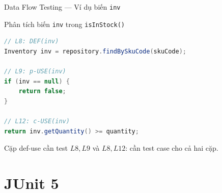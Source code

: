 \documentclass[aspectratio=169,12pt]{beamer}
\begin{document}
\begin{frame}[fragile]{Data Flow Testing --- Ví dụ biến \texttt{inv}}
  \begin{exampleblock}{Phân tích biến \texttt{inv} trong \texttt{isInStock()}}
\begin{lstlisting}[language=java,style=nonumber,basicstyle=\ttfamily\footnotesize]
// L8: DEF(inv)
Inventory inv = repository.findBySkuCode(skuCode);

// L9: p-USE(inv)
if (inv == null) {
    return false;
}

// L12: c-USE(inv)
return inv.getQuantity() >= quantity;
\end{lstlisting}
  \end{exampleblock}

  \vspace{0.3em}
  \Large
  \begin{block}{Cặp def-use cần test}
    \(L8, L9\) và \(L8, L12\): cần test case cho cả hai cặp.
  \end{block}
\end{frame}

\section{JUnit 5}
\end{document}
